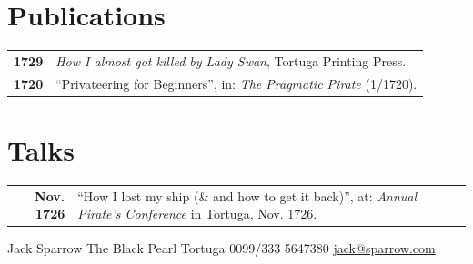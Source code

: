 \documentclass[lighthipster]{simplehipstercv}
\newlength{\rightcolwidth}
\begin{document}
\begin{paracol}{2}
\begin{minipage}[t]{0.3\textwidth}
\end{minipage}\hfill
\begin{minipage}[t]{0.3\textwidth}
\section*{Publications}
\begin{tabular}{>{\footnotesize\bfseries}r >{\footnotesize}p{}}
    1729 & \emph{How I almost got killed by Lady Swan}, Tortuga Printing Press. \\
    1720 & ``Privateering for Beginners'', in: \emph{The Pragmatic Pirate} (1/1720).
\end{tabular}
\bigskip

\section*{Talks}
\begin{tabular}{>{\footnotesize\bfseries}r >{\footnotesize}p{}}
    Nov. 1726 & ``How I lost my ship (\& and how to get it back)'', at: \emph{Annual Pirate's Conference} in Tortuga, Nov. 1726.
\end{tabular}
\end{minipage}






\vfill{} %

\setlength{\parindent}{0pt}
\begin{minipage}[t]{\rightcolwidth}
\begin{center}\fontfamily{\sfdefault}\selectfont \color{black!70}
{\small Jack Sparrow  The Black Pearl  Tortuga  0099/333 5647380 \newline{} \protect\url{jack@sparrow.com}
}
\end{center}
\end{minipage}

\end{paracol}
\end{document}
